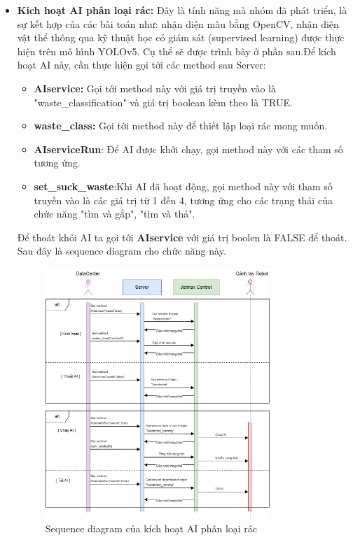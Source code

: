 \begin{itemize}
    \item \textbf{Kich hoạt AI phân loại rác:} Đây là tính năng mà nhóm đã phát triển, là sự kết hợp của các bài toán như: nhận diện màu bằng OpenCV, nhận diện vật thể thông qua kỹ thuật học có giám sát (supervised learning) được thực hiện trên mô hình YOLOv5. Cụ thể sẽ được trình bày ở phần sau.Để kích hoạt AI này, cần thực hiện gọi tới các method sau Server:
    \begin{itemize}
        \item \textbf{AIservice:} Gọi tới method này với giá trị truyền vào là "waste\_classification" và giá trị boolean kèm theo là TRUE.
        \item  \textbf{waste\_class:} Gọi tới method này để thiết lập loại rác mong muốn.

        \item  \textbf{AIserviceRun}: Để AI được khởi chạy, gọi method này với các tham số tương ứng.
        
        \item  \textbf{set\_suck\_waste}:Khi AI đã hoạt động, gọi method này với tham số truyền vào là các giá trị từ 1 đến 4, tương ứng cho các trạng thái của chức năng "tìm và gắp", "tìm và thả".     
    \end{itemize}
    Để thoát khỏi AI ta gọi tới \textbf{AIservice} với giá trị boolen là FALSE để thoát. Sau đây là sequence diagram cho chức năng này.
    \begin{figure}[!h]
        \centering
        \includegraphics[width=0.8\textwidth]{Images/Implementation/Control/waste-classification.jpg}
        \caption{Sequence diagram của kích hoạt AI phân loại rác}
    \end{figure}


\end{itemize}
